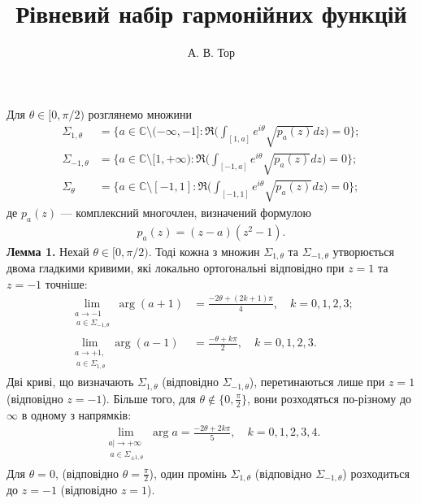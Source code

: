 \documentclass[]{article}
\title{\sffamily Рівневий набір гармонійних функцій}
\author{А. В. Тор}
\date{}
\begin{document}
\maketitle
Для $ \theta \in [0, \pi/2) $ розглянемо множини
\begin{align*}
    \Sigma_{1,\theta} &= \bigg\{ a \in \mathbb{C} \setminus (-\infty,-1] : \Re \bigg( \int_{[1,a]} e^{i\theta} \sqrt{p_a (z)} dz \bigg) = 0 \bigg\};\\
    \Sigma_{-1,\theta} &= \bigg\{ a \in \mathbb{C} \setminus [1,+\infty) : \Re \bigg( \int_{[-1,a]} e^{i\theta} \sqrt{p_a (z)} dz \bigg) = 0 \bigg\};\\
    \Sigma_{\theta} &= \bigg\{ a \in \mathbb{C} \setminus [-1,1] : \Re \bigg( \int_{[-1,1]} e^{i\theta} \sqrt{p_a (z)} dz \bigg) = 0 \bigg\};
\end{align*}
де $ p_a (z) $ — комплексний многочлен, визначений формулою
\begin{align*}
    p_a (z) = (z - a)(z^2 - 1).
\end{align*}
\textbf{Лемма 1.} \textsf{Нехай $ \theta \in [0, \pi/2) $. Тоді кожна з множин $ \Sigma_{1,\theta} $ та $ \Sigma_{-1,\theta} $ утворюється двома гладкими кривими, які локально ортогональні відповідно при $ z = 1 $ та $ z = -1 $ точніше:
\begin{align*}
    \lim_{\substack{a \to -1 \\ \ a \in \Sigma_{-1,\theta}}} \arg (a+1) &= \frac{-2\theta + (2k + 1) \pi}{4}, \quad k = 0,1,2,3; \\
    \lim_{\substack{a \to +1, \\ \ a \in \Sigma_{1,\theta}}} \arg (a-1) &= \frac{-\theta + k\pi}{2}, \quad k = 0,1,2,3.
\end{align*}
Дві криві, що визначають $ \Sigma_{1,\theta} $ (відповідно $ \Sigma_{-1,\theta} $), перетинаються лише при $ z = 1 $ (відповідно $ z = -1 $). Більше того, для $ \theta \notin \{0, \frac{\pi}{2}\} $, вони розходяться по-різному до $\infty$ в одному з напрямків:
\begin{align*}
    \lim_{\substack{a| \to +\infty \\ \ a \in \Sigma_{\pm1,\theta}}} \arg a = \frac{-2\theta + 2k\pi}{5}, \quad k = 0,1,2,3,4.
\end{align*}
Для $ \theta = 0 $, (відповідно $ \theta = \frac{\pi}{2} $), один промінь $ \Sigma_{1,\theta} $ (відповідно $ \Sigma_{-1,\theta} $) розходиться до $ z = -1 $ (відповідно $ z = 1 $).}\\
\end{document}
